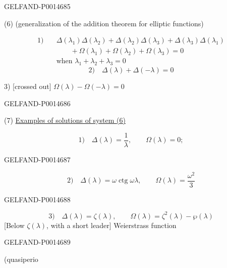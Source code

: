 \begin{GelfandAdjacentEvidence}{GELFAND-P001468}{5}


(6) 
\quad (generalization of the addition theorem for elliptic functions)

\[
\begin{aligned}
1)\quad &\Delta(\lambda_1)\Delta(\lambda_2)+\Delta(\lambda_2)\Delta(\lambda_3)
+\Delta(\lambda_3)\Delta(\lambda_1)\\
&\qquad +\Omega(\lambda_1)+\Omega(\lambda_2)+\Omega(\lambda_3)=0\\
&\text{when }\lambda_1+\lambda_2+\lambda_3=0
\end{aligned}
\]
\[
2)\quad \Delta(\lambda)+\Delta(-\lambda)=0
\]

3) [crossed out] \(\Omega(\lambda)-\Omega(-\lambda)=0\)
\end{GelfandAdjacentEvidence}
\begin{GelfandAdjacentEvidence}{GELFAND-P001468}{6}


(7) \uline{Examples of solutions of system (6)}

\[
1)\quad \Delta(\lambda)=\frac1\lambda,\qquad \Omega(\lambda)=0;
\]
\end{GelfandAdjacentEvidence}
\begin{GelfandAdjacentEvidence}{GELFAND-P001468}{7}


\[
2)\quad \Delta(\lambda)=\omega\operatorname{ctg}\omega\lambda,\qquad
\Omega(\lambda)=\frac{\omega^2}{3}
\]
\end{GelfandAdjacentEvidence}
\begin{GelfandAdjacentEvidence}{GELFAND-P001468}{8}


\[
3)\quad \Delta(\lambda)=\zeta(\lambda),\qquad \Omega(\lambda)=\zeta^2(\lambda)-\wp(\lambda)
\]
[Below \(\zeta(\lambda)\), with a short leader] Weierstrass function
\end{GelfandAdjacentEvidence}
\begin{GelfandAdjacentEvidence}{GELFAND-P001468}{9}


(quasiperio
\end{GelfandAdjacentEvidence}



